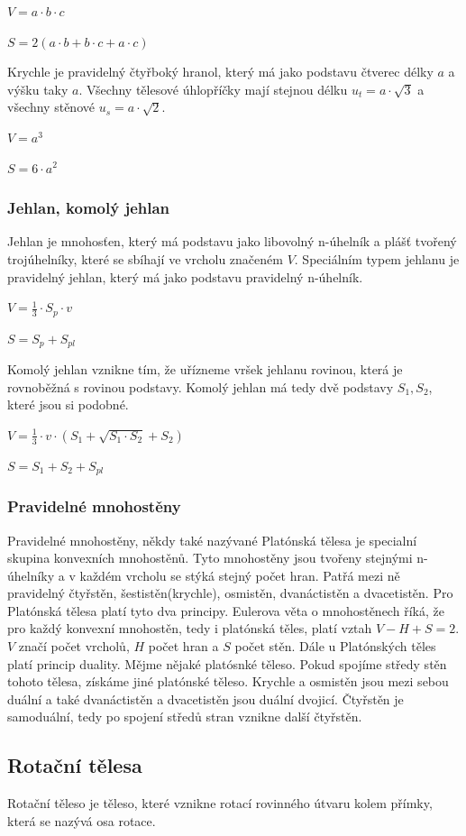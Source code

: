\documentclass[12pt]{article}
\begin{document}
$V = a \cdot b \cdot c$

$S = 2(a \cdot b + b \cdot c + a \cdot c)$

Krychle je pravidelný čtyřboký hranol, který má jako podstavu čtverec délky $a$ a výšku taky $a$.
Všechny tělesové úhlopříčky mají stejnou délku $u_t = a \cdot \sqrt{3}$ a všechny stěnové $u_s =
a \cdot \sqrt{2}$.

$V = a^3$

$S = 6 \cdot a^2$

\subsubsection*{Jehlan, komolý jehlan}
Jehlan je mnohosťen, který má podstavu jako libovolný n-úhelník a plášť tvořený trojúhelníky, které
se sbíhají ve vrcholu značeném $V$. Speciálním typem jehlanu je pravidelný jehlan, který má jako
podstavu pravidelný n-úhelník.

$V = \frac{1}{3} \cdot S_p \cdot v$

$S = S_p + S_{pl}$

Komolý jehlan vznikne tím, že uřízneme vršek jehlanu rovinou, která je rovnoběžná s rovinou podstavy.
Komolý jehlan má tedy dvě podstavy $S_1, S_2$, které jsou si podobné.

$V = \frac{1}{3} \cdot v \cdot (S_1 + \sqrt{S_1 \cdot S_2} + S_2)$

$S = S_1 + S_2 + S_{pl}$
\subsubsection*{Pravidelné mnohostěny}
Pravidelné mnohostěny, někdy také nazývané Platónská tělesa je specialní skupina konvexních 
mnohostěnů. Tyto mnohostěny jsou tvořeny stejnými n-úhelníky a v každém vrcholu se stýká stejný
počet hran. Patřá mezi ně pravidelný čtyřstěn, šestistěn(krychle), osmistěn, dvanáctistěn a
dvacetistěn. Pro Platónská tělesa platí tyto dva principy. Eulerova věta o mnohostěnech říká,
že pro každý konvexní mnohostěn, tedy i platónská těles, platí vztah $V - H + S = 2$. $V$ značí
počet vrcholů, $H$ počet hran a $S$ počet stěn. Dále u Platónských těles platí princip duality.
Mějme nějaké platósnké těleso. Pokud spojíme středy stěn tohoto tělesa, získáme jiné platónské
těleso. Krychle a osmistěn jsou mezi sebou duální a také dvanáctistěn a dvacetistěn jsou duální
dvojicí. Čtyřstěn je samoduální, tedy po spojení středů stran vznikne další čtyřstěn.

\subsection*{Rotační tělesa}
Rotační těleso je těleso, které vznikne rotací rovinného útvaru kolem přímky, která se nazývá osa 
rotace.
\end{document}
